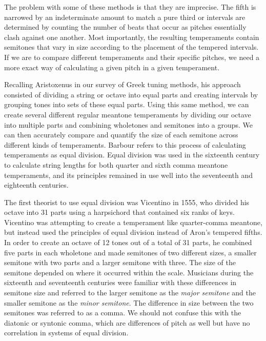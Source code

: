 The problem with some of these methods is that they are imprecise. The
fifth is narrowed by an indeterminate amount to match a pure third or
intervals are determined by counting the number of beats that occur as pitches
essentially clash against one another.  Most importantly, the resulting temperaments
contain semitones that vary in size according to the placement of the tempered intervals.
If we are to compare different temperaments and their specific pitches, we need a more
exact way of calculating a given pitch in a given temperament.

Recalling Aristoxenus in our survey of Greek tuning methods, his approach consisted of dividing a string or octave into
equal parts and creating intervals by grouping tones into sets of these equal parts. Using this same method, we can
create several different regular meantone temperaments by dividing our octave into multiple parts and combining
wholetones and semitones into a groups.  We can then accurately compare and quantify the size of each semitone across
different kinds of temperaments.  Barbour refers to this process of calculating temperaments as equal division. Equal
division was used in the sixteenth century to calculate string lengths for both quarter and sixth comma meantone
temperaments, and its principles remained in use well into the seventeenth and eighteenth centuries.

The first theorist to use equal division was Vicentino in 1555, who divided his octave
into 31 parts using a harpsichord that contained six ranks of keys. Vicentino was
attempting to create a temperament like quarter-comma meantone, but instead used the
principles of equal division instead of Aron's tempered fifths. In order to create an
octave of 12 tones out of a total of 31 parts, he combined five parts in each wholetone
and made semitones of two different sizes, a smaller semitone with two
parts and a larger semitone with three.  The size of the semitone depended on where it
occurred within the scale. Musicians during the sixteenth and seventeenth centuries
were familiar with these differences in semitone size and referred to the larger
semitone as the \textit{major semitone} and the smaller semitone as the \textit{minor
semitone}.  The difference in size between the two semitones was referred to as a
comma.  We should not confuse this with the diatonic or syntonic comma, which are
differences of pitch as well but have no correlation in systems of equal division.

